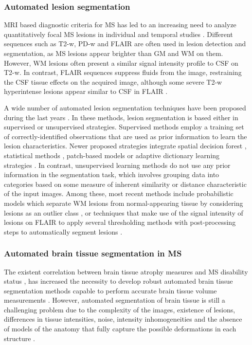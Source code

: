 \subsubsection{Automated lesion segmentation}

MRI based diagnostic criteria for MS has led to an increasing need to analyze quantitatively focal MS lesions in individual and temporal studies \cite{Cabezas2014, Polman2011}. Different sequences such as T2-w, PD-w and FLAIR are often used in lesion detection and segmentation, as MS lesions appear brighter than GM and WM on them. However, WM lesions often present a similar signal intensity profile to CSF on T2-w. In contrast, FLAIR sequences suppress fluids from the image, restraining the CSF tissue effects on the acquired image, although some severe T2-w hyperintense lesions appear similar to CSF in FLAIR \cite{Harmouche2015}. 

A wide number of automated lesion segmentation techniques have been proposed during the last years \cite{Garcia-Lorenzo2013, Llado2012}. In these methods, lesion segmentation is based either in supervised or unsupervised strategies. Supervised methods employ a training set of correctly-identified observations that are used as prior information to learn the lesion characteristics. Newer proposed strategies integrate spatial decision forest \cite{Geremia2011}, statistical methods \cite{Sweeney2013}, patch-based models \cite{Guizard2015} or adaptive dictionary learning strategies \cite{Deshpande2015}. In contrast, unsupervised learning methods do not use any prior information in the segmentation task, which involves grouping data into categories based on some measure of inherent similarity or distance characteristic of the input images. Among these, most recent methods include probabilistic models which separate WM lesions from normal-appearing tissue by considering lesions as an outlier class \cite{Harmouche2015,Jain2015,Tomas-Fernandez2015}, or techniques that make use of the signal intensity of lesions on FLAIR to apply several thresholding methods with post-processing steps to automatically segment lesions \cite{Roura2015, Schmidt2012}. 


\subsubsection{Automated brain tissue segmentation in MS}
\label{subsec:lesion_segmentation}
The existent correlation between brain tissue atrophy measures and MS disability status \cite{Filippi2013, Fisher2008}, has increased the necessity to develop robust automated brain tissue segmentation methods capable to perform accurate brain tissue volume measurements \cite{Giorgio2013}. However, automated segmentation of brain tissue is still a challenging problem due to the complexity of the images, existence of lesions, differences in tissue intensities, noise, intensity inhomogeneities and the absence of models of the anatomy that fully capture the possible deformations in each structure \cite{Cabezas2011, Kapur1996}. 

